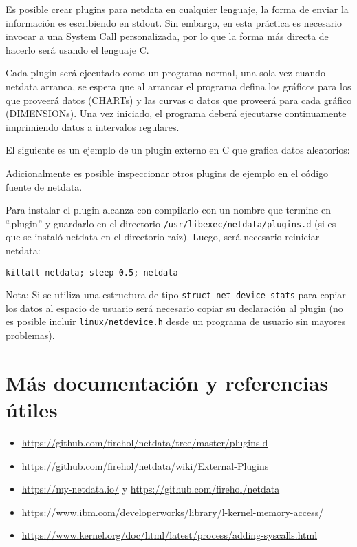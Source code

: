 Es posible crear plugins para netdata en cualquier lenguaje, la forma de enviar
la información es escribiendo en stdout. Sin embargo, en esta práctica es
necesario invocar a una System Call personalizada, por lo que la forma más
directa de hacerlo será usando el lenguaje C.

Cada plugin será ejecutado como un programa normal, una sola vez cuando netdata
arranca, se espera que al arrancar el programa defina los gráficos para los que
proveerá datos (CHARTs) y las curvas o datos que proveerá para cada gráfico
(DIMENSIONs). Una vez iniciado, el programa deberá ejecutarse continuamente
imprimiendo datos a intervalos regulares.

El siguiente es un ejemplo de un plugin externo en C que grafica datos
aleatorios:



Adicionalmente es posible inspeccionar otros plugins de ejemplo en el código
fuente de netdata.

Para instalar el plugin alcanza con compilarlo con un nombre que termine en
“.plugin” y guardarlo en el directorio \texttt{/usr/libexec/netdata/plugins.d}
(si es que se instaló netdata en el directorio raíz). Luego, será necesario
reiniciar netdata:

\begin{lstlisting}[frame=lrtb]
killall netdata; sleep 0.5; netdata
\end{lstlisting}

Nota: Si se utiliza una estructura de tipo \verb+struct net_device_stats+
para copiar los datos al espacio de usuario será
necesario copiar su declaración al plugin (no es posible incluir
\texttt{linux/netdevice.h} desde un programa de usuario sin mayores problemas).
\section{Más documentación y referencias útiles}


\begin{itemize}
    \item \url{https://github.com/firehol/netdata/tree/master/plugins.d}
    \item \url{https://github.com/firehol/netdata/wiki/External-Plugins}
    \item \url{https://my-netdata.io/} y \url{https://github.com/firehol/netdata}
    \item \url{https://www.ibm.com/developerworks/library/l-kernel-memory-access/}
    \item \url{https://www.kernel.org/doc/html/latest/process/adding-syscalls.html}
\end{itemize}


